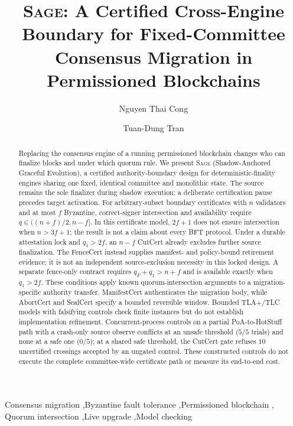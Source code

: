 \documentclass[5p,times,twocolumn]{elsarticle}
\theoremstyle{definition}
\theoremstyle{remark}
\newcommand{\cert}[1]{\textsf{#1}}
\newcommand{\CutCert}{\cert{CutCert}}
\newcommand{\ManCert}{\cert{ManifestCert}}
\newcommand{\FenceCert}{\cert{FenceCert}}
\newcommand{\AbortCert}{\cert{AbortCert}}
\newcommand{\SealCert}{\cert{SealCert}}
\newcommand{\sage}{\textsc{Sage}}
\begin{document}
\begin{frontmatter}

\title{\sage: A Certified Cross-Engine Boundary for Fixed-Committee Consensus Migration in Permissioned Blockchains}

\author[uit]{Nguyen Thai Cong}
\author[uit]{Tuan-Dung Tran}

\begin{abstract}
Replacing the consensus engine of a running permissioned blockchain changes who can finalize
blocks and under which quorum rule. We present \sage{} (Shadow-Anchored Graceful Evolution),
a certified authority-boundary design for deterministic-finality engines sharing one fixed,
identical committee and monolithic state. The source remains the sole finalizer during shadow
execution; a deliberate certification pause precedes target activation. For arbitrary-subset
boundary certificates with $n$ validators and at most $f$ Byzantine, correct-signer intersection
and availability require $q\in((n+f)/2,n-f]$. In this certificate model, $2f+1$ does not ensure
intersection when $n>3f+1$; the result is not a claim about every BFT protocol. Under a durable
attestation lock and $q_1>2f$, an $n-f$ \CutCert{} already excludes further source finalization.
The \FenceCert{} instead supplies manifest- and policy-bound retirement evidence; it is not an
independent source-exclusion necessity in this locked design. A separate fence-only contract
requires $q_F+q_1>n+f$ and is available exactly when $q_1>2f$. These conditions apply known
quorum-intersection arguments to a migration-specific authority transfer. \ManCert{} authenticates
the migration body, while \AbortCert{} and \SealCert{} specify a bounded reversible window.
Bounded TLA+/TLC models with falsifying controls check finite instances but do not establish
implementation refinement. Concurrent-process controls on a partial PoA-to-HotStuff path with a
crash-only source observe conflicts at an unsafe threshold ($5/5$ trials) and none at a safe one
($0/5$); at a shared safe threshold, the \CutCert{} gate refuses $10$ uncertified crossings
accepted by an ungated control. These constructed controls do not execute the complete
committee-wide certificate path or measure its end-to-end cost.
\end{abstract}

\begin{keyword}
Consensus migration \sep Byzantine fault tolerance \sep Permissioned blockchain \sep
Quorum intersection \sep Live upgrade \sep Model checking
\end{keyword}

\end{frontmatter}
\end{document}
